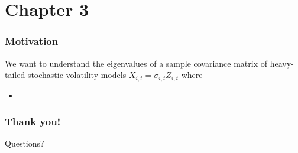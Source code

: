 \documentclass{beamer}
\begin{document}
\section{Chapter 3}

\begin{frame}
  \frametitle{Motivation}
  We want to understand the eigenvalues of a sample covariance matrix
  of heavy-tailed stochastic volatility models
  $X_{i, t} = \sigma_{i, t} Z_{i,t}$ where
  \begin{itemize}
  \item 
  \end{itemize}
  
\end{frame}
\begin{frame}
   \frametitle{Thank you!}
   Questions?
 \end{frame}


\end{document}

